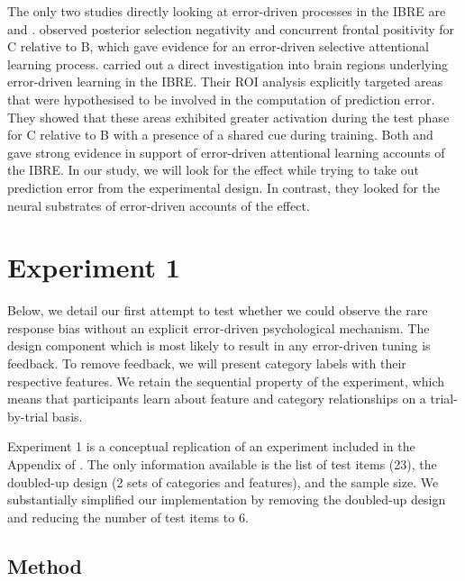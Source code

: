 \documentclass[10pt,letterpaper]{article}
\begin{document}
The only two studies directly looking at error-driven processes in the IBRE are  and .
 observed posterior selection negativity and concurrent frontal positivity for C relative to B, which gave evidence for an error-driven selective attentional learning process.
 carried out a direct investigation into brain regions underlying error-driven learning in the IBRE.
Their ROI analysis explicitly targeted areas that were hypothesised to be involved in the computation of prediction error.
They showed that these areas exhibited greater activation during the test phase for C relative to B with a presence of a shared cue during training.
Both  and  gave strong evidence in support of error-driven attentional learning accounts of the IBRE.
In our study, we will look for the effect while trying to take out prediction error from the experimental design.
In contrast, they looked for the neural substrates of error-driven accounts of the effect.

\section{Experiment 1}

Below, we detail our first attempt to test whether we could observe the rare response bias without an explicit error-driven psychological mechanism.
The design component which is most likely to result in any error-driven tuning is feedback.
To remove feedback, we will present category labels with their respective features.
We retain the sequential property of the experiment, which means that participants learn about feature and category relationships on a trial-by-trial basis.

Experiment 1 is a conceptual replication of an experiment included in the Appendix of .
The only information available is the list of test items (23), the doubled-up design (2 sets of categories and features), and the sample size.
We substantially simplified our implementation by removing the doubled-up design and reducing the number of test items to 6.

\subsection{Method}
\end{document}
